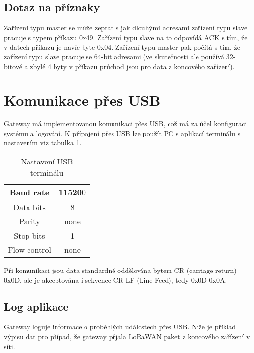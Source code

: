 \subsection{Dotaz na příznaky}
Zařízení typu master se může zeptat s jak dlouhými adresami zařízení typu slave pracuje s typem příkazu 0x49. Zařízení typu slave na to odpovídá ACK s tím, že v datech příkazu je navíc byte 0x04. Zařízení typu master pak počítá s tím, že zařízení typu slave pracuje se 64-bit adresami (ve skutečnosti ale používá 32-bitové a zbylé 4 byty v příkazu průchod jsou pro data z koncového zařízení).

\section{Komunikace přes USB}
Gateway má implementovanou komunikaci přes USB, což má za účel konfiguraci systému a logování. K přípojení přes USB lze použít PC s  aplikací terminálu s nastavením viz tabulka \ref{table:usb_term}.

\begin{table}[!h]
    \centering
    \begin{tabular}{ |c|c| }
     \hline

     Baud rate              & 115200           \\ \hline
     Data bits              & 8                 \\ \hline
     Parity                 & none              \\ \hline
     Stop bits              & 1                 \\ \hline
     Flow control           & none               \\ \hline

    \end{tabular}
    \caption{Nastavení USB terminálu}
    \label{table:usb_term}
\end{table}

Při komunikaci jsou data standardně oddělována bytem CR (carriage return) 0x0D, ale je akceptována i sekvence CR LF (Line Feed), tedy 0x0D 0x0A. 

\subsection{Log aplikace}
Gateway loguje informace o proběhlých událostech přes USB. 
Níže je příklad výpisu dat pro případ, že gateway přjala LoRaWAN paket z koncového zařízení v síti.

